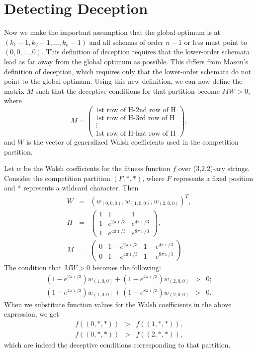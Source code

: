 \section{Detecting Deception}
Now we make the important assumption that the global optimum is at
$(k_1-1,k_2-1,\ldots,k_n-1)$ and all schemas of order $n-1$ or less
must point to $(0,0,\ldots,0)$.  
This definition of deception requires that the lower-order schemata
lead as far away from the global optimum as possible.
This differs from Mason's definition of deception, which requires only
that the lower-order schemata do not point to the global optimum.
Using this new definition, we can now define the
matrix $M$ such that the deceptive conditions for that partition become
$M W>0$, where
\begin{equation}
M= \left(\begin{array}{c}
	\mbox{1st row of H-2nd row of H} \\
	\mbox{1st row of H-3rd row of H} \\
	\vdots \\
	\mbox{1st row of H-last row of H}
	\end{array}
	\right),
\end{equation}
and $W$ is the vector of generalized Walsh coefficients used in the
competition partition.

\begin{example}
Let $w$ be the Walsh coefficients for the fitness function $f$
over (3,2,2)-ary strings.  Consider the competition partition $(F,*,*)$, where
$F$ represents a fixed position and * represents a wildcard character.  Then
\begin{eqnarray}
W&=&(w_{(0,0,0)},w_{(1,0,0)},w_{(2,0,0)})^T, \nonumber\\
H&=&\left(\begin{array}{ccc}
	1&1&1\\
	1&e^{2 \pi \imath/3}&e^{4 \pi \imath/3}\\
	1&e^{4 \pi \imath/3}&e^{8 \pi \imath/3}
	\end{array}
	\right), \nonumber\\
M&=&\left(\begin{array}{ccc}
	0&1-e^{2 \pi \imath/3}&1-e^{4 \pi \imath/3} \\
	0&1-e^{4 \pi \imath/3}&1-e^{8 \pi \imath/3}
	\end{array}
	\right).
\end{eqnarray}
The condition that $MW>0$ becomes the following:
\begin{eqnarray}
(1-e^{2\pi \imath/3})w_{(1,0,0)}+(1-e^{4\pi\imath/3})w_{(2,0,0)} &>&0;\nonumber\\
(1-e^{4\pi \imath/3})w_{(1,0,0)}+(1-e^{8\pi\imath/3})w_{(2,0,0)} &>&0.
\end{eqnarray}
When we substitute function values for the Walsh coefficients in the above
expression, we get
\begin{eqnarray}
f((0,*,*)) &>& f((1,*,*)), \nonumber\\
f((0,*,*)) &>& f((2,*,*)),
\end{eqnarray}
which are indeed the deceptive conditions corresponding to that partition.
\end{example}

